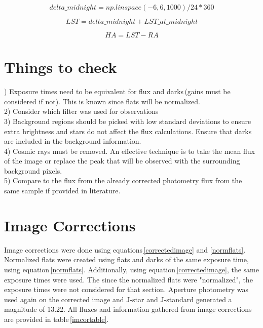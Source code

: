 \documentclass[onecolumn]{aastex6}
\begin{document}
\begin{equation}
delta\_midnight = np.linspace(-6, 6, 1000) / 24*360
\label{delmid}
\end{equation}

\begin{equation}
LST = delta\_midnight + LST\_at\_midnight
\label{lst}
\end{equation}

\begin{equation}
HA=LST-RA
\label{hourangle}
\end{equation}



\section{Things to check}
) Exposure times need to be equivalent for flux and darks\,(gains must be considered if not). This is known since flats will be normalized.
\\
2) Consider which filter was used for observations
\\
3) Background regions should be picked with low standard deviations to ensure extra brightness and stars do not affect the flux calculations. Ensure that darks are included in the background information.
\\
4) Cosmic rays must be removed. An effective technique is to take the mean flux of the image or replace the peak that will be observed with the surrounding background pixels.
\\
5) Compare to the flux from the already corrected photometry flux from the same sample if provided in literature.






\section{Image Corrections}
Image corrections were done using equations\,\ref{correctedimage} and \ref{normflats}. Normalized flats were created using flats and darks of the same exposure time, using equation\,\ref{normflats}. Additionally, using equation\,\ref{correctedimage}, the same exposure times were used. The since the normalized flats were "normalized", the exposure times were not considered for that section. Aperture photometry was used again on the corrected image and J-star and J-standard generated a magnitude of 13.22. All fluxes and information gathered from image corrections are provided in table\,\ref{imcortable}.
\end{document}
